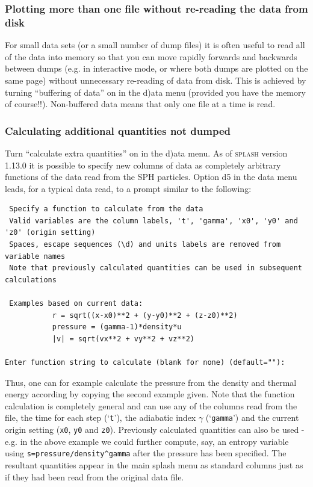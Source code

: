 \documentclass[a4paper,10pt]{article}
\newcommand{\splash}{\textsc{splash }}
\begin{document}
\subsubsection{ Plotting more than one file without re-reading the data from disk}
\label{sec:buffering}
 For small data sets (or a small number of dump files) it is often useful to read all of the data into memory so that you can move rapidly forwards and backwards between dumps (e.g. in interactive mode, or where both dumps are plotted on the same page) without unnecessary re-reading of data from disk. This is achieved by turning ``buffering of data'' on in the d)ata menu (provided you have the memory of course!!). Non-buffered data means that only one file at a time is read.

\subsubsection{ Calculating additional quantities not dumped}
Turn ``calculate extra quantities'' on in the d)ata menu. As of \splash version 1.13.0 it is possible to specify new columns of data as completely arbitrary functions of the data read from the SPH particles. Option d5 in the data menu leads, for a typical data read, to a prompt similar to the following:

\begin{verbatim}
 Specify a function to calculate from the data 
 Valid variables are the column labels, 't', 'gamma', 'x0', 'y0' and 'z0' (origin setting) 
 Spaces, escape sequences (\d) and units labels are removed from variable names
 Note that previously calculated quantities can be used in subsequent calculations

 Examples based on current data: 
           r = sqrt((x-x0)**2 + (y-y0)**2 + (z-z0)**2)
           pressure = (gamma-1)*density*u
           |v| = sqrt(vx**2 + vy**2 + vz**2)
           
Enter function string to calculate (blank for none) (default=""):
\end{verbatim}

Thus, one can for example calculate the pressure from the density and thermal energy according by copying the second example given. Note that the function calculation is completely general and can use any of the columns read from the file, the time for each step (`\verb+t+'), the adiabatic index $\gamma$ (`\verb+gamma+') and the current origin setting (\verb+x0+, \verb+y0+ and \verb+z0+). Previously calculated quantities can also be used - e.g. in the above example we could further compute, say, an entropy variable using \verb+s=pressure/density^gamma+ after the pressure has been specified. The resultant quantities appear in the main splash menu as standard columns just as if they had been read from the original data file.
\end{document}
